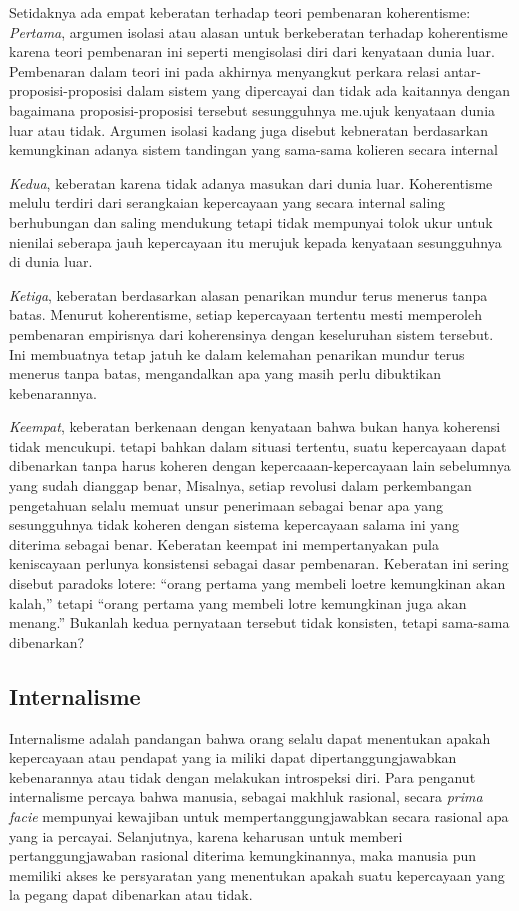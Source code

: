 \documentclass[11pt,twoside,a5paper,openany]{memoir}
\begin{document}
Setidaknya ada empat keberatan terhadap teori pembenaran koherentisme:
\emph{Pertama}, argumen isolasi atau alasan untuk berkeberatan terhadap
koherentisme karena teori pembenaran ini seperti mengisolasi diri dari
kenyataan dunia luar. Pembenaran dalam teori ini pada akhirnya
menyangkut perkara relasi antar-proposisi-proposisi dalam sistem yang
dipercayai dan tidak ada kaitannya dengan bagaimana proposisi-proposisi
tersebut sesungguhnya me.ujuk kenyataan dunia luar atau tidak. Argumen
isolasi kadang juga disebut kebneratan berdasarkan kemungkinan adanya
sistem tandingan yang sama-sama kolieren secara internal

\emph{Kedua}, keberatan karena tidak adanya masukan dari dunia luar.
Koherentisme melulu terdiri dari serangkaian kepercayaan yang secara
internal saling berhubungan dan saling mendukung tetapi tidak mempunyai
tolok ukur untuk nienilai seberapa jauh kepercayaan itu merujuk kepada
kenyataan sesungguhnya di dunia luar.

\emph{Ketiga}, keberatan berdasarkan alasan penarikan mundur terus
menerus tanpa batas. Menurut koherentisme, setiap kepercayaan tertentu
mesti memperoleh pembenaran empirisnya dari koherensinya dengan
keseluruhan sistem tersebut. Ini membuatnya tetap jatuh ke dalam
kelemahan penarikan mundur terus menerus tanpa batas, mengandalkan apa
yang masih perlu dibuktikan kebenarannya.

\emph{Keempat}, keberatan berkenaan dengan kenyataan bahwa bukan hanya
koherensi tidak mencukupi. tetapi bahkan dalam situasi tertentu, suatu
kepercayaan dapat dibenarkan tanpa harus koheren dengan
kepercaaan-kepercayaan lain sebelumnya yang sudah dianggap benar,
Misalnya, setiap revolusi dalam perkembangan pengetahuan selalu memuat
unsur penerimaan sebagai benar apa yang sesungguhnya tidak koheren
dengan sistema kepercayaan salama ini yang diterima sebagai benar.
Keberatan keempat ini mempertanyakan pula keniscayaan perlunya
konsistensi sebagai dasar pembenaran. Keberatan ini sering disebut
paradoks lotere: ``orang pertama yang membeli loetre kemungkinan akan
kalah,'' tetapi ``orang pertama yang membeli lotre kemungkinan juga akan
menang.'' Bukanlah kedua pernyataan tersebut tidak konsisten, tetapi
sama-sama dibenarkan?

\hypertarget{internalisme}{%
\subsection{Internalisme}\label{internalisme}}

Internalisme adalah pandangan bahwa orang selalu dapat menentukan apakah
kepercayaan atau pendapat yang ia miliki dapat dipertanggungjawabkan
kebenarannya atau tidak dengan melakukan introspeksi diri. Para penganut
internalisme percaya bahwa manusia, sebagai makhluk rasional, secara
\emph{prima facie} mempunyai kewajiban untuk mempertanggungjawabkan
secara rasional apa yang ia percayai. Selanjutnya, karena keharusan
untuk memberi pertanggungjawaban rasional diterima kemungkinannya, maka
manusia pun memiliki akses ke persyaratan yang menentukan apakah suatu
kepercayaan yang la pegang dapat dibenarkan atau tidak.
\end{document}
